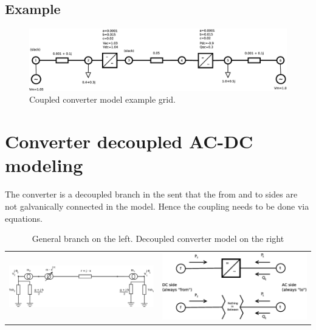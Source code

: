 \documentclass[11pt]{article}
\begin{document}
	\subsection{Example}
	
	\begin{figure}[h!]
		\centering
		\includegraphics[width=1.0\linewidth]{acdc_6bus_diagram_fubm}
		\caption{Coupled converter model example grid.}
		\label{fig:acdc6busdiagram_fubm}
	\end{figure}

	

	\newpage
	\section{Converter decoupled AC-DC modeling}
	
	The converter is a decoupled branch in the sent that the from and to sides are not galvanically connected in the model.
	Hence the coupling needs to be done via equations.
	
	\begin{table}[h!]
	\begin{tabular}{cc} %
		\includegraphics[width=0.65\linewidth]{branch.eps} &
		\includegraphics[width=0.35\linewidth]{decoupled_converter_model.eps} \\
	\end{tabular}
	\caption{General branch on the left. Decoupled converter model on the right}
	\label{table:branch_and_converter}
	\end{table}
	
\end{document}
